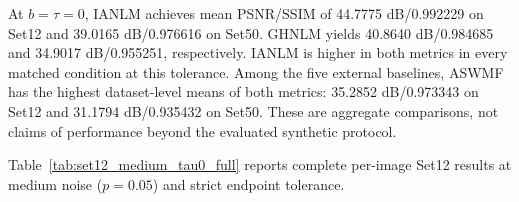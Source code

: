 \documentclass[pdflatex,iicol,sn-mathphys-num]{sn-jnl}
\newif\ifshowportuguese
\newcommand{\pt}[1]{\ifshowportuguese\par\begingroup\small\color{blue!55!black}\noindent\textbf{PT: }#1\par\endgroup\fi}
\begin{document}
At $b=\tau=0$, IANLM achieves mean PSNR/SSIM of 44.7775 dB/0.992229 on Set12 and 39.0165 dB/0.976616 on Set50. GHNLM yields 40.8640 dB/0.984685 and 34.9017 dB/0.955251, respectively. IANLM is higher in both metrics in every matched condition at this tolerance. Among the five external baselines, ASWMF has the highest dataset-level means of both metrics: 35.2852 dB/0.973343 on Set12 and 31.1794 dB/0.935432 on Set50. These are aggregate comparisons, not claims of performance beyond the evaluated synthetic protocol.
\pt{Em $b=\tau=0$, o IANLM alcança PSNR/SSIM médios de 44,7775 dB/0,992229 no Set12 e 39,0165 dB/0,976616 no Set50. O GHNLM obtém 40,8640 dB/0,984685 e 34,9017 dB/0,955251, respectivamente. O IANLM é superior nas duas métricas em toda condição correspondente nessa tolerância. Entre os cinco baselines externos, o ASWMF apresenta as maiores médias por conjunto das duas métricas: 35,2852 dB/0,973343 no Set12 e 31,1794 dB/0,935432 no Set50. Essas são comparações agregadas, não afirmações de desempenho além do protocolo sintético avaliado.}
Table~\ref{tab:set12_medium_tau0_full} reports complete per-image Set12 results at medium noise ($p=0.05$) and strict endpoint tolerance.
\pt{A Tabela~\ref{tab:set12_medium_tau0_full} apresenta os resultados completos por imagem do Set12 sob ruído médio ($p=0.05$) e tolerância estrita nos extremos.}
\end{document}
